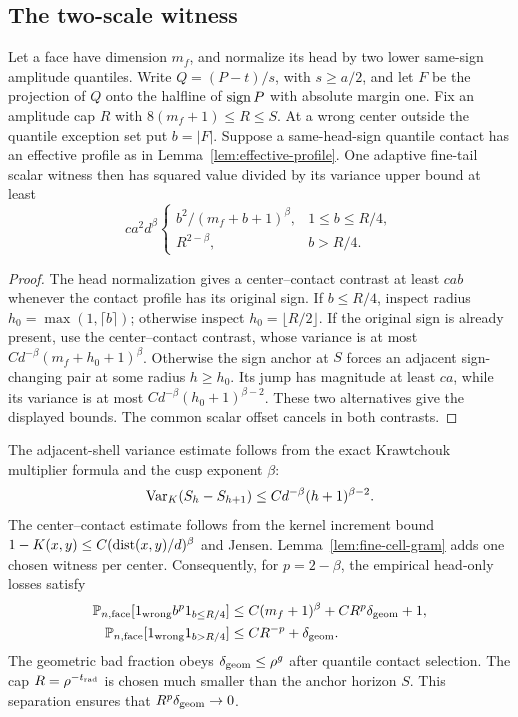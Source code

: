 \subsection{The two-scale witness}
\begin{lemma}\label{lem:coarse-witness}
Let a face have dimension $m_f$, and normalize its head by two lower
same-sign amplitude quantiles. Write $Q=(P-t)/s$, with $s\ge a/2$, and
let $F$ be the projection of $Q$ onto the halfline of $\operatorname{sign} P$ with
absolute margin one. Fix an amplitude cap $R$ with
$8(m_f+1)\le R\le S$. At a wrong center outside the quantile exception
set put $b=|F|$. Suppose a same-head-sign quantile contact has an effective
profile as in Lemma~\ref{lem:effective-profile}.
One adaptive fine-tail scalar witness then has squared value divided
by its variance upper bound at least
\[
 ca^2d^\beta
 \begin{cases}
 b^2/(m_f+b+1)^\beta,&1\le b\le R/4,\\
 R^{2-\beta},&b>R/4.
 \end{cases}
\]
\end{lemma}
\begin{proof}
The head normalization gives a center--contact contrast at least $cab$
whenever the contact profile has its original sign. If $b\le R/4$,
inspect radius $h_0=\max(1,\lceil b\rceil)$; otherwise inspect
$h_0=\lfloor R/2\rfloor$. If the original sign is already present,
use the center--contact contrast, whose variance is at most
$Cd^{-\beta}(m_f+h_0+1)^\beta$.
Otherwise the sign anchor at $S$ forces an adjacent sign-changing pair
at some radius $h\ge h_0$. Its jump has magnitude at least $ca$, while
its variance is at most $Cd^{-\beta}(h_0+1)^{\beta-2}$.
These two alternatives give the displayed bounds. The common scalar
offset cancels in both contrasts.
\end{proof}

The adjacent-shell variance estimate follows from the exact
Krawtchouk multiplier formula and the cusp exponent $\beta$:
\[
 \operatorname{Var}_K(S_h-S_{h+1})\le Cd^{-\beta}(h+1)^{\beta-2}.
\]
The center--contact estimate follows from the kernel increment bound
$1-K(x,y)\le C(\operatorname{dist}(x,y)/d)^\beta$ and Jensen.
Lemma~\ref{lem:fine-cell-gram} adds one chosen witness per center.
Consequently, for $p=2-\beta$, the empirical head-only losses satisfy
\begin{align}
 \mathbb P_{n,\rm face}[1_{\rm wrong}b^p1_{b\le R/4}]
   &\le C(m_f+1)^\beta+CR^p\delta_{\rm geom}+1,
       \label{eq:truncated-moment}\\
 \mathbb P_{n,\rm face}[1_{\rm wrong}1_{b>R/4}]
   &\le CR^{-p}+\delta_{\rm geom}.
       \label{eq:huge-set}
\end{align}
The geometric bad fraction obeys $\delta_{\rm geom}\le\rho^g$ after
quantile contact selection. The cap $R=\rho^{-t_{\rm rad}}$ is chosen
much smaller than the anchor horizon $S$. This separation ensures that
$R^p\delta_{\rm geom}\to0$.
